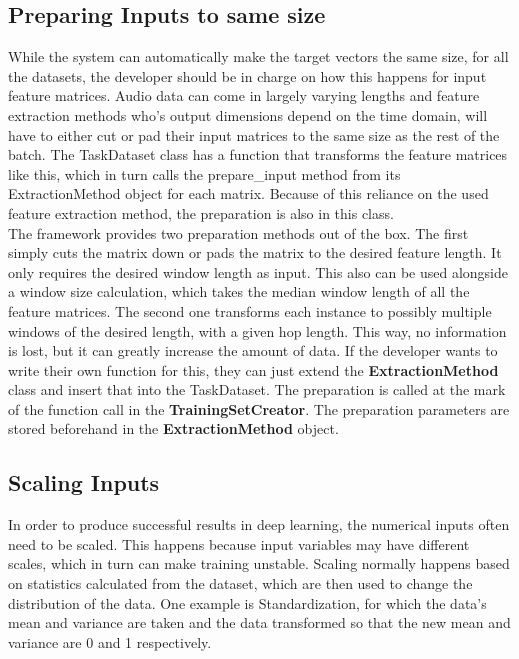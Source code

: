 \subsection{Preparing Inputs to same size} \label{Impl:DataLoad:Prep}

While the system can automatically make the target vectors the same size, for all the datasets, the developer should be in charge on how this happens for input feature matrices. Audio data can come in largely varying lengths and feature extraction methods who's output dimensions depend on the time domain, will have to either cut or pad their input matrices to the same size as the rest of the batch. The TaskDataset class has a function that transforms the feature matrices like this, which in turn calls the prepare\_input method from its ExtractionMethod object for each matrix. Because of this reliance on the used feature extraction method, the preparation is also in this class. \\

The framework provides two preparation methods out of the box. The first simply cuts the matrix down or pads the matrix to the desired feature length. It only requires the desired window length as input. This also can be used alongside a window size calculation, which takes the median window length of all the feature matrices. The second one transforms each instance to possibly multiple windows of the desired length, with a given hop length. This way, no information is lost, but it can greatly increase the amount of data. If the developer wants to write their own function for this, they can just extend the \textbf{ExtractionMethod} class and insert that into the TaskDataset. The preparation is called at the mark of the function call in the \textbf{TrainingSetCreator}. The preparation parameters are stored beforehand in the \textbf{ExtractionMethod} object.\\

\subsection{Scaling Inputs} \label{Impl:DataLoad:Scale}

In order to produce successful results in deep learning, the numerical inputs often need to be scaled. This happens because input variables may have different scales, which in turn can make training unstable. Scaling normally happens based on statistics calculated from the dataset, which are then used to change the distribution of the data. One example is Standardization, for which the data's mean and variance are taken and the data transformed so that the new mean and variance are 0 and 1 respectively. \\

